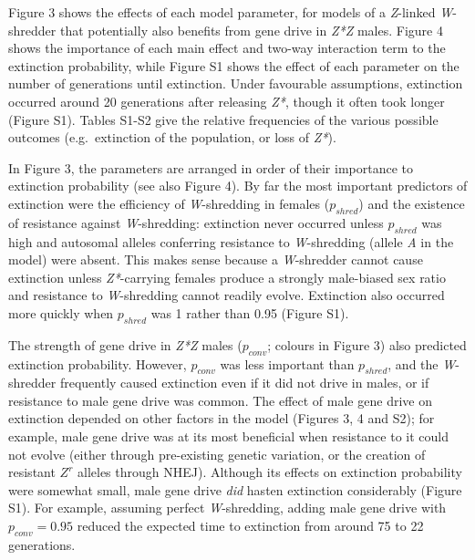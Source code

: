 \documentclass[]{rsos}%
\begin{document}
Figure 3 shows the effects of each model parameter, for models of a
\emph{Z}-linked \emph{W}-shredder that potentially also benefits from
gene drive in \emph{Z*Z} males. Figure 4 shows the importance of each
main effect and two-way interaction term to the extinction probability,
while Figure S1 shows the effect of each parameter on the number of
generations until extinction. Under favourable assumptions, extinction
occurred around 20 generations after releasing \emph{Z*}, though it
often took longer (Figure S1). Tables S1-S2 give the relative
frequencies of the various possible outcomes (e.g.~extinction of the
population, or loss of \emph{Z*}).

In Figure 3, the parameters are arranged in order of their importance to
extinction probability (see also Figure 4). By far the most important
predictors of extinction were the efficiency of \emph{W}-shredding in
females (\(p_{shred}\)) and the existence of resistance against
\emph{W}-shredding: extinction never occurred unless \(p_{shred}\) was
high and autosomal alleles conferring resistance to \emph{W}-shredding
(allele \emph{A} in the model) were absent. This makes sense because a
\emph{W}-shredder cannot cause extinction unless \emph{Z*}-carrying
females produce a strongly male-biased sex ratio and resistance to
\emph{W}-shredding cannot readily evolve. Extinction also occurred more
quickly when \(p_{shred}\) was 1 rather than 0.95 (Figure S1).

The strength of gene drive in \emph{Z*Z} males (\(p_{conv}\); colours in
Figure 3) also predicted extinction probability. However, \(p_{conv}\)
was less important than \(p_{shred}\), and the \emph{W}-shredder
frequently caused extinction even if it did not drive in males, or if
resistance to male gene drive was common. The effect of male gene drive
on extinction depended on other factors in the model (Figures 3, 4 and
S2); for example, male gene drive was at its most beneficial when
resistance to it could not evolve (either through pre-existing genetic
variation, or the creation of resistant \(Z^r\) alleles through NHEJ).
Although its effects on extinction probability were somewhat small, male
gene drive \emph{did} hasten extinction considerably (Figure S1). For
example, assuming perfect \emph{W}-shredding, adding male gene drive
with \(p_{conv} = 0.95\) reduced the expected time to extinction from
around 75 to 22 generations.
\end{document}
